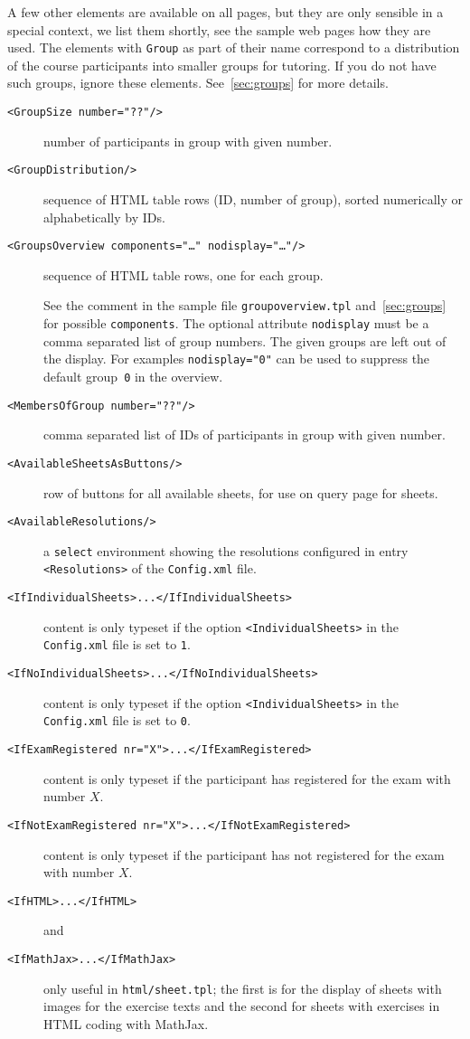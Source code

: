 \documentclass[12pt,openany,a4paper]{book}
\begin{document}
A few other elements are available on all pages, but they are only sensible in
a special context, we list them shortly, see the sample web pages how they
are used. The elements with \texttt{Group} as part of their name correspond
to a distribution of the course participants into smaller groups for
tutoring. If you do not have such groups, ignore these elements.
See~\ref{sec:groups} for more details.

\begin{description}
\item[\texttt{<GroupSize number="??"/>}] number of participants in group
with given number.
\item[\texttt{<GroupDistribution/>}] sequence of HTML table rows (ID, number of
group), sorted numerically or alphabetically by IDs.
\item[\texttt{<GroupsOverview components="\ldots" nodisplay="\ldots"/>}] 
sequence of HTML table rows, one for each group. 

See the comment in the sample file
\texttt{groupoverview.tpl} and~\ref{sec:groups} 
for possible \texttt{components}. The optional attribute \texttt{nodisplay}
must be a comma separated list of group numbers. The given groups are left
out of the display. For examples \texttt{nodisplay="0"} can be used to
suppress the default group~\texttt{0} in the overview.
\item[\texttt{<MembersOfGroup number="??"/>}] comma separated list of IDs of 
participants in group with given number.
\item[\texttt{<AvailableSheetsAsButtons/>}] row of buttons for all available
sheets,  for use on query page for sheets.
\item[\texttt{<AvailableResolutions/>}] a \texttt{select} environment
showing the resolutions configured in entry \texttt{<Resolutions>} of the
\texttt{Config.xml} file.
\item[\texttt{<IfIndividualSheets>...</IfIndividualSheets>}] 
content is only typeset if the option \texttt{<IndividualSheets>} in the 
\texttt{Config.xml} file is set to \texttt{1}.
\item[\texttt{<IfNoIndividualSheets>...</IfNoIndividualSheets>}] 
content is only typeset if the option \texttt{<IndividualSheets>} in the 
\texttt{Config.xml} file is set to \texttt{0}.
\item[\texttt{<IfExamRegistered nr="X">...</IfExamRegistered>}]
content is only typeset if the participant has registered for the exam
with number $X$.
\item[\texttt{<IfNotExamRegistered nr="X">...</IfNotExamRegistered>}]
content is only typeset if the participant has not registered for the exam
with number $X$.
\item[\texttt{<IfHTML>...</IfHTML>}] and \item[\texttt{<IfMathJax>...</IfMathJax>}]
only useful in \texttt{html/sheet.tpl}; the first is for the display of
sheets with images for the exercise texts and the second for sheets with
exercises in HTML coding with MathJax.
\end{description}
\end{document}
